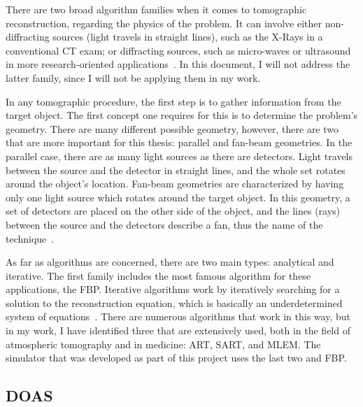 There are two broad algorithm families when it comes to tomographic
reconstruction, regarding the physics of the problem. It can involve
either non-diffracting sources (light travels in straight lines), such
as the X-Rays in a conventional \gls{CT} exam; or diffracting sources,
such as micro-waves or ultrasound in more research-oriented
applications~\cite{Kak2001}. In this document, I will not address the
latter family, since I will not be applying them in my work.

In any tomographic procedure, the first step is to gather information
from the target object. The first concept one requires for this is to
determine the problem's geometry. There are many different possible
geometry, however, there are two that are more important for this
thesis: parallel and fan-beam geometries. In the parallel case, there
are as many light sources as there are detectors. Light travels between
the source and the detector in straight lines, and the whole set rotates
around the object's location. Fan-beam geometries are characterized by
having only one light source which rotates around the target object. In
this geometry, a set of detectors are placed on the other side of the
object, and the lines (rays) between the source and the detectors
describe a fan, thus the name of the technique~\cite{Herman2009,
Kak2001}.

As far as algorithms are concerned, there are two main types: analytical
and iterative. The first family includes the most famous algorithm for
these applications, the \gls{FBP}. Iterative algorithms work by iteratively
searching for a solution to the reconstruction equation, which is
basically an underdetermined system of equations~.
There are numerous algorithms that work in this way, but in my work, I
have identified three that are extensively used, both in the field of
atmospheric tomography and in medicine: \gls{ART}, \gls{SART}, and
\gls{MLEM}. The simulator that was developed as part of this project
uses the last two and \gls{FBP}.

\subsection{\gls{DOAS}}%
\label{sub:doas}


